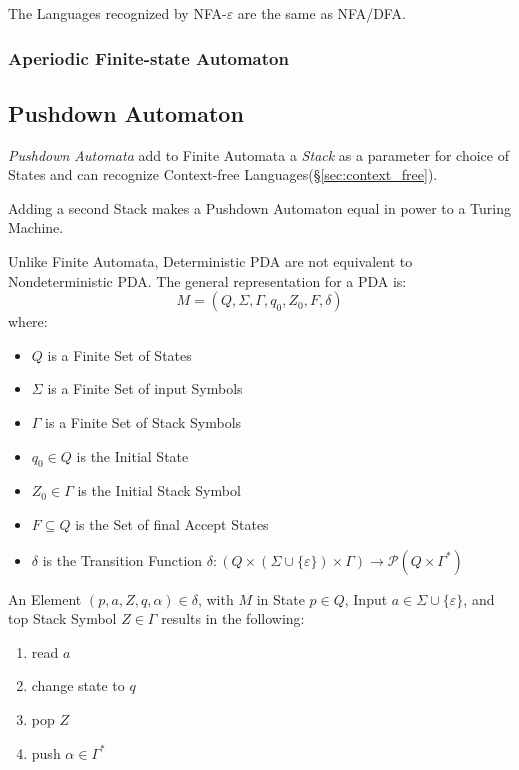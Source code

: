 The Languages recognized by NFA-$\varepsilon$ are the same as NFA/DFA.



\subsubsection{Aperiodic Finite-state Automaton}
\label{sec:aperiodic_automaton}



\subsection{Pushdown Automaton}\label{sec:pushdown_automaton}

\emph{Pushdown Automata} add to Finite Automata a \emph{Stack} as a
parameter for choice of States and can recognize Context-free
Languages(\S\ref{sec:context_free}).

Adding a second Stack makes a Pushdown Automaton equal in power to a
Turing Machine.

Unlike Finite Automata, Deterministic PDA are not equivalent to
Nondeterministic PDA. The general representation for a PDA is:
\[
  M = (Q, \Sigma, \Gamma, q_0, Z_0, F, \delta)
\]
where:
\begin{itemize}
  \item $Q$ is a Finite Set of States
  \item $\Sigma$ is a Finite Set of input Symbols
  \item $\Gamma$ is a Finite Set of Stack Symbols
  \item $q_0 \in Q$ is the Initial State
  \item $Z_0 \in \Gamma$ is the Initial Stack Symbol
  \item $F \subseteq Q$ is the Set of final Accept States
  \item $\delta$ is the Transition Function $\delta: (Q \times (\Sigma
    \cup \{\varepsilon\}) \times \Gamma) \rightarrow \mathcal{P}(Q \times
    \Gamma^*)$
\end{itemize}

An Element $(p,a,Z,q,\alpha)\in\delta$, with $M$ in State $p \in Q$,
Input $a \in \Sigma \cup \{\varepsilon\}$, and top Stack Symbol $Z \in
\Gamma$ results in the following:
\begin{enumerate}
  \item read $a$
  \item change state to $q$
  \item pop $Z$
  \item push $\alpha \in \Gamma^*$
\end{enumerate}



